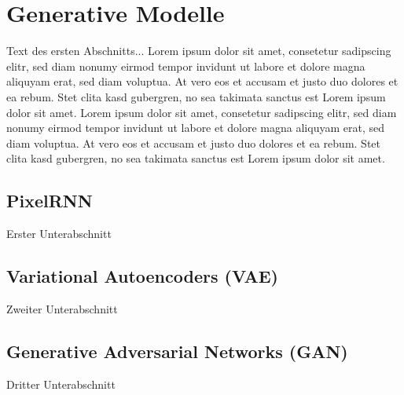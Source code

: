 \section{Generative Modelle}\label{Generative Modelle}

Text des ersten Abschnitts... Lorem ipsum dolor sit amet, consetetur sadipscing elitr, sed diam nonumy eirmod tempor invidunt ut labore et dolore magna aliquyam erat, sed diam voluptua. At vero eos et accusam et justo duo dolores et ea rebum. Stet clita kasd gubergren, no sea takimata sanctus est Lorem ipsum dolor sit amet. Lorem ipsum dolor sit amet, consetetur sadipscing elitr, sed diam nonumy eirmod tempor invidunt ut labore et dolore magna aliquyam erat, sed diam voluptua. At vero eos et accusam et justo duo dolores et ea rebum. Stet clita kasd gubergren, no sea takimata sanctus est Lorem ipsum dolor sit amet.

\subsection{PixelRNN}\label{PixelRNN}

Erster Unterabschnitt

\subsection{Variational Autoencoders (VAE)}\label{Variational Autoencoders (VAE)}

Zweiter Unterabschnitt

\subsection{Generative Adversarial Networks (GAN)}\label{Generative Adversarial Networks (GAN)}

Dritter Unterabschnitt

